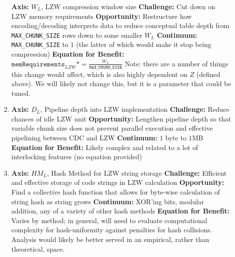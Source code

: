 \documentclass{article}
\begin{document}
\begin{enumerate}
\begin{enumerate}
\textbf{Axis:} $W_L$, LZW compression window size
\newline
\textbf{Challenge:} Cut down on LZW memory requirements
\newline
\textbf{Opportunity:} Restructure how encoding/decoding interprets data to reduce conceptual table depth from \texttt{MAX\_CHUNK\_SIZE} rows down to some smaller $W_L$
\newline
\textbf{Continuum:} \texttt{MAX\_CHUNK\_SIZE} to $1$ (the latter of which would make it stop being compression)
\newline
\textbf{Equation for Benefit:} $\texttt{memRequirements}_{LZW} *= \frac{W_L}{\texttt{MAX\_CHUNK\_SIZE}}$\newline
Note: there are a number of things this change would affect, which is also highly dependent on $Z$ (defined above). We will likely not change this, but it is a parameter that could be tuned.

\item%

\textbf{Axis:} $D_L$, Pipeline depth into LZW implementation
\newline
\textbf{Challenge:} Reduce chances of idle LZW unit
\newline
\textbf{Opportunity:} Lengthen pipeline depth so that variable chunk size does not prevent parallel execution and effective pipelining between CDC and LZW
\newline
\textbf{Continuum:} $1$ byte to $1$MB
\newline
\textbf{Equation for Benefit:} Likely complex and related to a lot of interlocking features (no equation provided)

\item%

\textbf{Axis:} $HM_{L}$, Hash Method for LZW string storage
\newline
\textbf{Challenge:} Efficient and effective storage of code strings in LZW calculation
\newline
\textbf{Opportunity:} Find a collective hash function that allows for byte-wise calculation of string hash as string grows
\newline
\textbf{Continuum:} XOR'ing bits, modular addition, any of a variety of other hash methods
\newline
\textbf{Equation for Benefit:} Varies by method; in general, will need to evaluate computational complexity for hash-uniformity against penalties for hash collisions. Analysis would likely be better served in an empirical, rather than theoretical, space.



\end{enumerate}
\end{enumerate}
\end{document}
